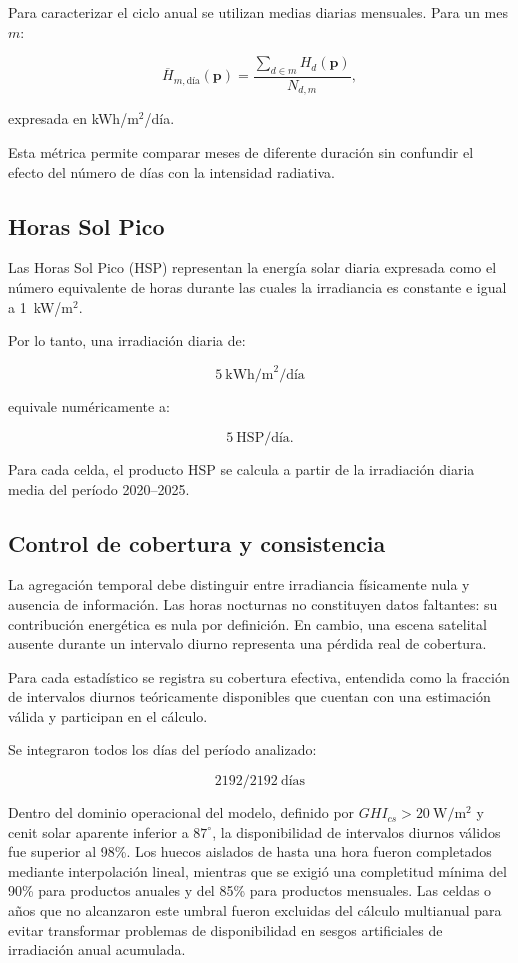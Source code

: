 \documentclass[11pt,a4paper]{article}
\begin{document}
Para caracterizar el ciclo anual se utilizan medias diarias mensuales. Para un mes $m$:

\[
\overline{H}_{m,\text{día}}(\mathbf{p})
=
\frac{\sum_{d\in m} H_d(\mathbf{p})}{N_{d,m}},
\]

expresada en kWh/m$^2$/día.

Esta métrica permite comparar meses de diferente duración sin confundir el efecto del número de días con la intensidad radiativa.

\subsection{Horas Sol Pico}

Las Horas Sol Pico (HSP) representan la energía solar diaria expresada como el número equivalente de horas durante las cuales la irradiancia es constante e igual a 1~kW/m$^2$.

Por lo tanto, una irradiación diaria de:

\[
5~\text{kWh/m}^2\text{/día}
\]

equivale numéricamente a:

\[
5~\text{HSP/día}.
\]

Para cada celda, el producto HSP se calcula a partir de la irradiación diaria media del período 2020--2025.

\subsection{Control de cobertura y consistencia}

La agregación temporal debe distinguir entre irradiancia físicamente nula y ausencia de información. Las horas nocturnas no constituyen datos faltantes: su contribución energética es nula por definición. En cambio, una escena satelital ausente durante un intervalo diurno representa una pérdida real de cobertura.

Para cada estadístico se registra su cobertura efectiva, entendida como la fracción de intervalos diurnos teóricamente disponibles que cuentan con una estimación válida y participan en el cálculo.

Se integraron todos los días del período analizado:

\[
\boxed{2192/2192\ \text{días}}
\]

Dentro del dominio operacional del modelo, definido por $GHI_{cs}>20\ \mathrm{W/m^2}$ y cenit solar aparente inferior a $87^\circ$, la disponibilidad de intervalos diurnos válidos fue superior al 98\%. Los huecos aislados de hasta una hora fueron completados mediante interpolación lineal, mientras que se exigió una completitud mínima del 90\% para productos anuales y del 85\% para productos mensuales. Las celdas o años que no alcanzaron este umbral fueron excluidas del cálculo multianual para evitar transformar problemas de disponibilidad en sesgos artificiales de irradiación anual acumulada.
\end{document}
